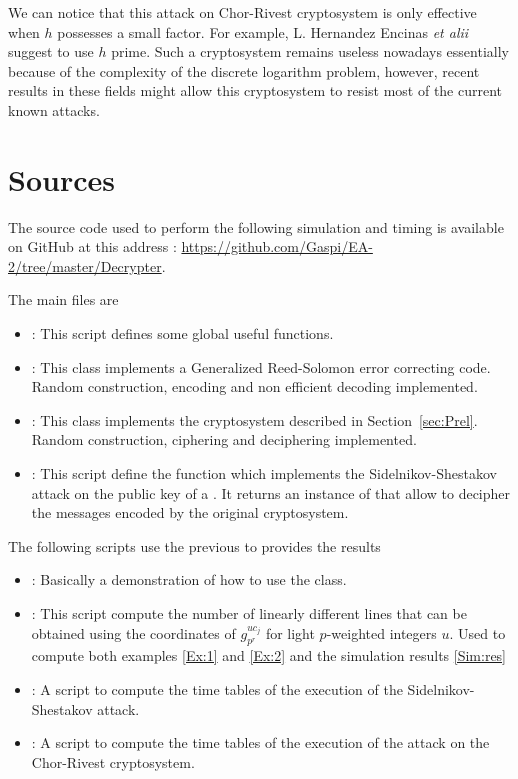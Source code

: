 \documentclass[a4paper]{article}
\begin{document}
We can notice that this attack on Chor-Rivest cryptosystem is only effective when $h$ possesses a small factor. For example, L. Hernandez Encinas \textit{et alii} \cite{Enc04} suggest to use $h$ prime. Such a cryptosystem remains useless nowadays essentially because of the complexity of the discrete logarithm problem, however, recent results in these fields might allow this cryptosystem to resist most of the current known attacks.










\newpage
\appendix
\section{Sources}

The source code used to perform the following simulation and timing is available on GitHub at this address : \url{https://github.com/Gaspi/EA-2/tree/master/Decrypter}.

The main files are
\begin{itemize}
\item {}: This script defines some global useful functions.
\item {}: This class implements a Generalized Reed-Solomon error correcting code. Random construction, encoding and non efficient decoding implemented.
\item {}: This class implements the cryptosystem described in Section~\ref{sec:Prel}. Random construction, ciphering and deciphering implemented.
\item {}: This script define the function  which implements the Sidelnikov-Shestakov attack on the public key of a . It returns an instance of  that allow to decipher the messages encoded by the original cryptosystem.
\end{itemize}
The following scripts use the previous to provides the results
\begin{itemize}
\item {}: Basically a demonstration of how to use the  class.
\item {}: This script compute the number of linearly different lines that can be obtained using the coordinates of $g_{p^r}^{uc_j}$ for light $p$-weighted integers $u$. Used to compute both examples \ref{Ex:1} and \ref{Ex:2} and the simulation results \ref{Sim:res}
\item {}: A script to compute the time tables of the execution of the Sidelnikov-Shestakov attack.
\item {}: A script to compute the time tables of the execution of the attack on the Chor-Rivest cryptosystem.
\end{itemize}
\end{document}

